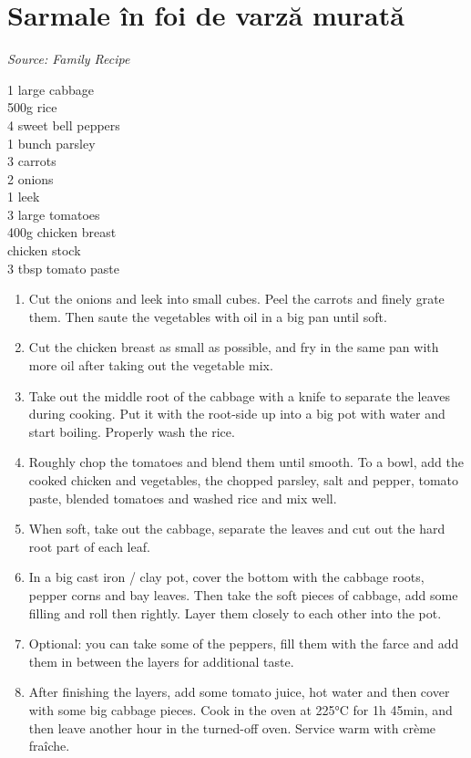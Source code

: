 \documentclass{report}
\begin{document}
\section[Sarmale]{Sarmale în foi de varză murată}
\textit{Source: Family Recipe}\\
\begin{minipage}[t]{0.21\textwidth} \vspace{0pt} 
1 large cabbage\\
500g rice\\
4 sweet bell peppers\\
1 bunch parsley\\
3 carrots\\
2 onions\\
1 leek\\
3 large tomatoes\\
400g chicken breast\\
chicken stock\\
3 tbsp tomato paste\\
\end{minipage}
\hfill
\begin{minipage}[t]{0.78\textwidth} \vspace{0pt}
	\begin{enumerate}
		\item Cut the onions and leek into small cubes. Peel the carrots and finely grate them. Then saute the vegetables with oil in a big pan until soft.
		\item Cut the chicken breast as small as possible, and fry in the same pan with more oil after taking out the vegetable mix.
		\item Take out the middle root of the cabbage with a knife to separate the leaves during cooking. Put it with the root-side up into a big pot with water and start boiling. Properly wash the rice.
		\item Roughly chop the tomatoes and blend them until smooth. To a bowl, add the cooked chicken and vegetables, the chopped parsley, salt and pepper, tomato paste, blended tomatoes and washed rice and mix well.
		\item When soft, take out the cabbage, separate the leaves and cut out the hard root part of each leaf.
		\item In a big cast iron / clay pot, cover the bottom with the cabbage roots, pepper corns and bay leaves. Then take the soft pieces of cabbage, add some filling and roll then rightly. Layer them closely to each other into the pot.
		\item Optional: you can take some of the peppers, fill them with the farce and add them in between the layers for additional taste.
		\item After finishing the layers, add some tomato juice, hot water and then cover with some big cabbage pieces. Cook in the oven at 225°C for 1h 45min, and then leave another hour in the turned-off oven. Service warm with crème fraîche.
	\end{enumerate}	
\end{minipage}
\end{document}
